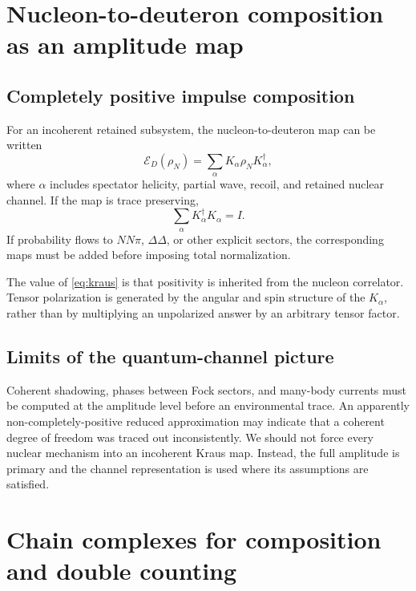 \documentclass[11pt]{article}
\begin{document}
\section{Nucleon-to-deuteron composition as an amplitude map}

\subsection{Completely positive impulse composition}

For an incoherent retained subsystem, the nucleon-to-deuteron map can be
written
\begin{equation}
\mathcal E_D(\rho_N)
=
\sum_\alpha K_\alpha\rho_NK_\alpha^\dagger,
\label{eq:kraus}
\end{equation}
where \(\alpha\) includes spectator helicity, partial wave, recoil, and
retained nuclear channel.  If the map is trace preserving,
\begin{equation}
\sum_\alpha K_\alpha^\dagger K_\alpha=I.
\label{eq:trace-preserving}
\end{equation}
If probability flows to \(NN\pi\), \(\Delta\Delta\), or other explicit
sectors, the corresponding maps must be added before imposing total
normalization.

The value of \cref{eq:kraus} is that positivity is inherited from the
nucleon correlator.  Tensor polarization is generated by the angular and
spin structure of the \(K_\alpha\), rather than by multiplying an
unpolarized answer by an arbitrary tensor factor.

\subsection{Limits of the quantum-channel picture}

Coherent shadowing, phases between Fock sectors, and many-body currents
must be computed at the amplitude level before an environmental trace.
An apparently non-completely-positive reduced approximation may indicate
that a coherent degree of freedom was traced out inconsistently.  We should
not force every nuclear mechanism into an incoherent Kraus map.  Instead,
the full amplitude is primary and the channel representation is used where
its assumptions are satisfied.

\section{Chain complexes for composition and double counting}
\end{document}
